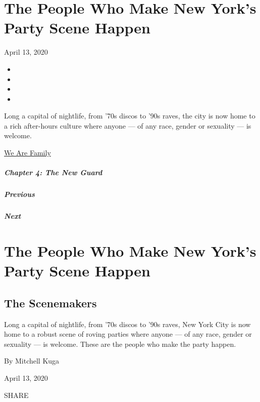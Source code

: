 \hypertarget{the-people-who-make-new-yorks-party-scene-happen}{%
\section{The People Who Make New York's Party Scene
Happen}\label{the-people-who-make-new-yorks-party-scene-happen}}

April 13, 2020

\begin{itemize}
\item
\item
\item
\item
\end{itemize}

Long a capital of nightlife, from '70s discos to '90s raves, the city is
now home to a rich after-hours culture where anyone --- of any race,
gender or sexuality --- is welcome.

\href{https://www.nytimes3xbfgragh.onion/interactive/2020/04/13/t-magazine/culture-issue-2020.html}{We
Are Family}

\hypertarget{chapter-4-the-new-guard}{%
\subparagraph{Chapter 4: The New Guard}\label{chapter-4-the-new-guard}}

\hypertarget{previous}{%
\subparagraph{Previous}\label{previous}}

\hypertarget{next}{%
\subparagraph{Next}\label{next}}

\hypertarget{the-people-who-make-new-yorks-party-scene-happen-1}{%
\section{The People Who Make New York's Party Scene
Happen}\label{the-people-who-make-new-yorks-party-scene-happen-1}}

\hypertarget{the-scenemakers}{%
\subsection{The Scenemakers}\label{the-scenemakers}}

Long a capital of nightlife, from '70s discos to '90s raves, New York
City is now home to a robust scene of roving parties where anyone --- of
any race, gender or sexuality --- is welcome. These are the people who
make the party happen.

By Mitchell Kuga

April 13, 2020

SHARE

